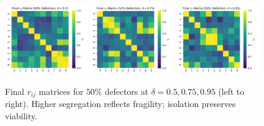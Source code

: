 \documentclass[11pt]{article}
\begin{document}
\begin{figure}[h]
  \centering
  \includegraphics[width=0.32\textwidth]{rij_heatmap_50pct_delta_05.pdf}\hfill
  \includegraphics[width=0.32\textwidth]{rij_heatmap_50pct_delta_075.pdf}\hfill
  \includegraphics[width=0.32\textwidth]{rij_heatmap_50pct_delta_095.pdf}
  \caption{Final $r_{ij}$ matrices for $50\%$ defectors at $\delta=0.5,0.75,0.95$ (left to right). Higher segregation reflects fragility; isolation preserves viability.}
\end{figure}
\end{document}
